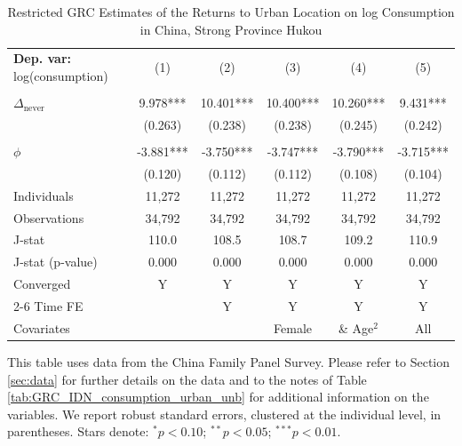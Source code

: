 \begin{table}[htbp] \centering \begin{threeparttable}
 \caption{Restricted GRC Estimates of the Returns to Urban Location on log Consumption in China, Strong Province Hukou} 
 \label{tab:GRC_CHN_strong_consumption_urban_unb} 
\begin{tabular}{l ccccc} \toprule  \textbf{Dep. var:}  log(consumption) 
                    &\multicolumn{1}{c}{(1)}   &\multicolumn{1}{c}{(2)}   &\multicolumn{1}{c}{(3)}   &\multicolumn{1}{c}{(4)}   &\multicolumn{1}{c}{(5)}   \\
                    &               &               &               &               &               \\
\addlinespace
$\Delta_{\text{never}}$&       9.978***&      10.401***&      10.400***&      10.260***&       9.431***\\
                    &     (0.263)   &     (0.238)   &     (0.238)   &     (0.245)   &     (0.242)   \\
                    &               &               &               &               &               \\
\addlinespace
$\phi$              &      -3.881***&      -3.750***&      -3.747***&      -3.790***&      -3.715***\\
                    &     (0.120)   &     (0.112)   &     (0.112)   &     (0.108)   &     (0.104)   \\
\addlinespace
Individuals         &      11,272   &      11,272   &      11,272   &      11,272   &      11,272   \\
Observations        &      34,792   &      34,792   &      34,792   &      34,792   &      34,792   \\
J-stat              &       110.0   &       108.5   &       108.7   &       109.2   &       110.9   \\
J-stat (p-value)    &       0.000   &       0.000   &       0.000   &       0.000   &       0.000   \\
Converged           &           Y   &           Y   &           Y   &           Y   &           Y   \\
\cmidrule{2-6} Time FE & & Y & Y & Y & Y \\ Covariates & & & Female & \& Age$^2$ & All \\ \bottomrule \end{tabular} \begin{tablenotes}[flushleft] \footnotesize \item{This table uses data from the China Family Panel Survey. Please refer to Section \ref{sec:data} for further details on the data and to the notes of Table \ref{tab:GRC_IDN_consumption_urban_unb} for additional information on the variables. We report robust standard errors, clustered at the individual level, in parentheses. Stars denote: $^{*} p<0.10$; $^{**} p<0.05$; $^{***} p<0.01$.} \end{tablenotes} \end{threeparttable} \end{table}
